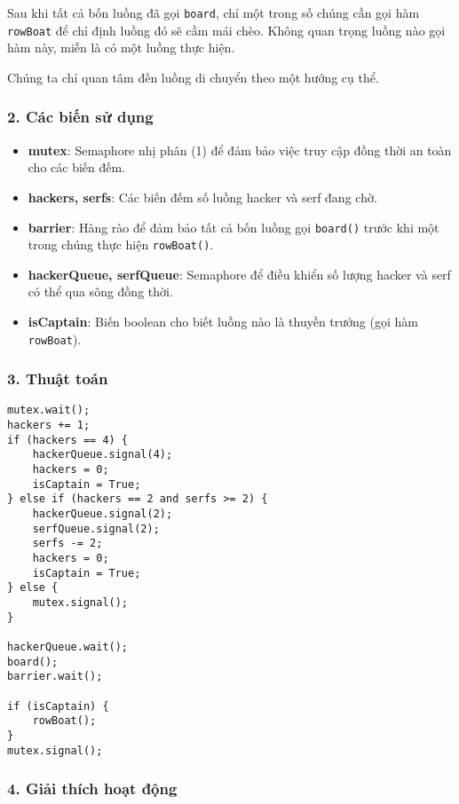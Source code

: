 Sau khi tất cả bốn luồng đã gọi \texttt{board}, chỉ một trong số chúng cần gọi hàm \texttt{rowBoat} để chỉ định luồng đó sẽ cầm mái chèo. Không quan trọng luồng nào gọi hàm này, miễn là có một luồng thực hiện.

Chúng ta chỉ quan tâm đến luồng di chuyển theo một hướng cụ thể.

\subsubsection*{2. Các biến sử dụng}

\begin{itemize}
  \item \textbf{mutex}: Semaphore nhị phân (1) để đảm bảo việc truy cập đồng thời an toàn cho các biến đếm.
  \item \textbf{hackers, serfs}: Các biến đếm số luồng hacker và serf đang chờ.
  \item \textbf{barrier}: Hàng rào để đảm bảo tất cả bốn luồng gọi \texttt{board()} trước khi một trong chúng thực hiện \texttt{rowBoat()}.
  \item \textbf{hackerQueue, serfQueue}: Semaphore để điều khiển số lượng hacker và serf có thể qua sông đồng thời.
  \item \textbf{isCaptain}: Biến boolean cho biết luồng nào là thuyền trưởng (gọi hàm \texttt{rowBoat}).
\end{itemize}

\subsubsection*{3. Thuật toán}

\begin{lstlisting}
mutex.wait();
hackers += 1;
if (hackers == 4) {
    hackerQueue.signal(4);
    hackers = 0;
    isCaptain = True;
} else if (hackers == 2 and serfs >= 2) {
    hackerQueue.signal(2);
    serfQueue.signal(2);
    serfs -= 2;
    hackers = 0;
    isCaptain = True;
} else {
    mutex.signal();
}

hackerQueue.wait();
board();
barrier.wait();

if (isCaptain) {
    rowBoat();
}
mutex.signal();
\end{lstlisting}


\subsubsection*{4. Giải thích hoạt động}

